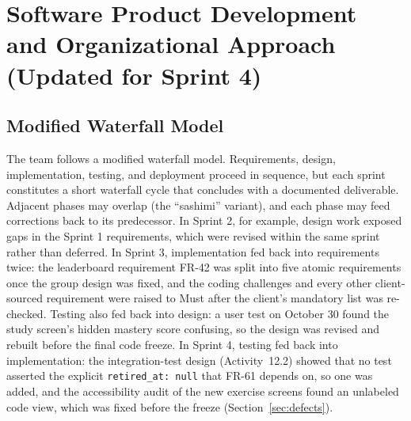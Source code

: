 \documentclass[12pt,letterpaper]{article}
\begin{document}
\section{Software Product Development and Organizational Approach (Updated for Sprint 4)}\label{sec:process}

\subsection{Modified Waterfall Model}
The team follows a modified waterfall model. Requirements, design, implementation,
testing, and deployment proceed in sequence, but each sprint constitutes a short
waterfall cycle that concludes with a documented deliverable. Adjacent phases may
overlap (the ``sashimi'' variant), and each phase may feed corrections back to its
predecessor. In Sprint 2, for example, design work exposed gaps in the Sprint 1
requirements, which were revised within the same sprint rather than deferred. In
Sprint 3, implementation fed back into requirements twice: the leaderboard requirement
FR-42 was split into five atomic requirements once the group design was fixed, and the
coding challenges and every other client-sourced requirement were raised to Must after
the client's mandatory list was re-checked. Testing also fed back into design: a user test on October 30 found the
study screen's hidden mastery score confusing, so the design was revised and rebuilt
before the final code freeze. In Sprint 4, testing fed back into implementation: the
integration-test design (Activity~12.2) showed that no test asserted the explicit
\texttt{retired\_at: null} that FR-61 depends on, so one was added, and the
accessibility audit of the new exercise screens found an unlabeled code view, which
was fixed before the freeze (Section~\ref{sec:defects}).
\end{document}
